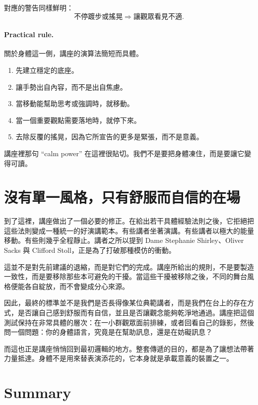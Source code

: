對應的警告同樣鮮明：
\begin{equation}
\text{不停踱步或搖晃} \Longrightarrow \text{讓觀眾看見不適}.
\end{equation}

\paragraph{Practical rule.} 關於身體這一側，講座的演算法簡短而具體。
\begin{enumerate}
\item 先建立穩定的底座。
\item 讓手勢出自內容，而不是出自焦慮。
\item 當移動能幫助思考或強調時，就移動。
\item 當一個重要觀點需要落地時，就停下來。
\item 去除反覆的搖晃，因為它所宣告的更多是緊張，而不是意義。
\end{enumerate}

講座裡那句 ``calm power'' 在這裡很貼切。我們不是要把身體凍住，而是要讓它變得可讀。

\section{沒有單一風格，只有舒服而自信的在場}

到了這裡，講座做出了一個必要的修正。在給出若干具體經驗法則之後，它拒絕把這些法則變成一種統一的好演講範本。有些講者坐著演講。有些講者以極大的能量移動。有些則幾乎全程靜止。講者之所以提到 Dame Stephanie Shirley、Oliver Sacks 與 Clifford Stoll，正是為了打破那種模仿的衝動。

這並不是對先前建議的退縮，而是對它們的完成。講座所給出的規則，不是要製造一致性，而是要移除那些本可避免的干擾。當這些干擾被移除之後，不同的舞台風格便能各自綻放，而不會變成分心來源。

因此，最終的標準並不是我們是否長得像某位典範講者，而是我們在台上的存在方式，是否讓自己感到舒服而有自信，並且是否讓觀念能夠乾淨地通過。講座把這個測試保持在非常具體的層次：在一小群觀眾面前排練，或者回看自己的錄影，然後問一個問題：你的身體語言，究竟是在幫助訊息，還是在妨礙訊息？

而這也正是講座悄悄回到最初邏輯的地方。整套傳遞的目的，都是為了讓想法帶著力量抵達。身體不是用來替表演添花的，它本身就是承載意義的裝置之一。

\section{Summary}

